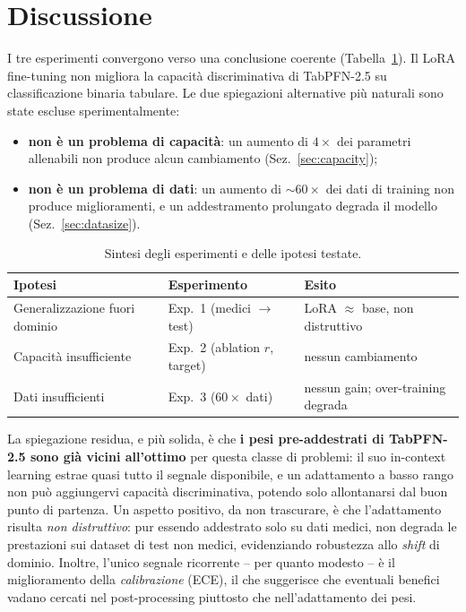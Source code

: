 \documentclass[11pt,a4paper]{article}
\begin{document}
\section{Discussione}
I tre esperimenti convergono verso una conclusione coerente
(Tabella~\ref{tab:summary}). Il LoRA fine-tuning non migliora la capacità
discriminativa di TabPFN-2.5 su classificazione binaria tabulare. Le due
spiegazioni alternative più naturali sono state escluse sperimentalmente:
\begin{itemize}[nosep]
  \item \textbf{non è un problema di capacità}: un aumento di $4\times$ dei
  parametri allenabili non produce alcun cambiamento (Sez.~\ref{sec:capacity});
  \item \textbf{non è un problema di dati}: un aumento di $\sim$$60\times$ dei
  dati di training non produce miglioramenti, e un addestramento prolungato
  degrada il modello (Sez.~\ref{sec:datasize}).
\end{itemize}

\begin{table}[h]
\centering
\caption{Sintesi degli esperimenti e delle ipotesi testate.}
\label{tab:summary}
\small
\begin{tabular}{lll}
\toprule
Ipotesi & Esperimento & Esito \\
\midrule
Generalizzazione fuori dominio & Exp.~1 (medici $\to$ test) & LoRA $\approx$ base, non distruttivo \\
Capacità insufficiente & Exp.~2 (ablation $r$, target) & nessun cambiamento \\
Dati insufficienti & Exp.~3 ($60\times$ dati) & nessun gain; over-training degrada \\
\bottomrule
\end{tabular}
\end{table}

La spiegazione residua, e più solida, è che \textbf{i pesi pre-addestrati di
TabPFN-2.5 sono già vicini all'ottimo} per questa classe di problemi: il suo
in-context learning estrae quasi tutto il segnale disponibile, e un adattamento a
basso rango non può aggiungervi capacità discriminativa, potendo solo
allontanarsi dal buon punto di partenza. Un aspetto positivo, da non trascurare,
è che l'adattamento risulta \emph{non distruttivo}: pur essendo addestrato solo
su dati medici, non degrada le prestazioni sui dataset di test non medici,
evidenziando robustezza allo \emph{shift} di dominio. Inoltre, l'unico segnale
ricorrente -- per quanto modesto -- è il miglioramento della \emph{calibrazione}
(ECE), il che suggerisce che eventuali benefici vadano cercati nel
post-processing piuttosto che nell'adattamento dei pesi.
\end{document}
